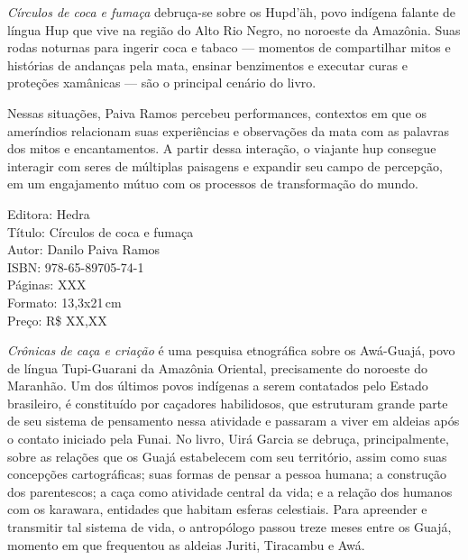 \pagebreak


\noindent{}\textit{Círculos de coca e fumaça} debruça-se sobre os Hupd’äh, povo indígena falante de língua Hup que vive na região do Alto Rio Negro, no noroeste da Amazônia. Suas rodas noturnas para ingerir coca e tabaco --- momentos de compartilhar mitos e histórias de andanças pela mata, ensinar benzimentos e executar curas e proteções xamânicas --- são o principal cenário do livro. 

Nessas situações, Paiva Ramos percebeu performances, contextos em que os ameríndios relacionam suas experiências e observações da mata com as palavras dos mitos e encantamentos. A partir dessa interação, o viajante hup consegue interagir com seres de múltiplas paisagens e expandir seu campo de percepção, em um engajamento mútuo com os processos de transformação do mundo.

\begin{ficha}
Editora: Hedra\\
Título: Círculos de coca e fumaça\\
Autor:  Danilo Paiva Ramos\\ 
ISBN: 978-65-89705-74-1\\
Páginas: XXX\\
Formato: 13,3x21\,cm\\
Preço: R\$ XX,XX\\
\end{ficha}

\pagebreak


\noindent{}\textit{Crônicas de caça e criação} é uma pesquisa etnográfica sobre os Awá-Guajá, povo de língua Tupi-Guarani da Amazônia Oriental, precisamente do noroeste do Maranhão. Um dos últimos povos indígenas a serem contatados pelo Estado brasileiro, é constituído por caçadores habilidosos, que estruturam grande parte de seu sistema de pensamento nessa atividade e passaram a viver em aldeias após o contato iniciado pela Funai. No livro, Uirá Garcia se debruça, principalmente, sobre as relações que os Guajá estabelecem com seu território, assim como suas concepções cartográficas; suas formas de pensar a pessoa humana; a construção dos parentescos; a caça como atividade central da vida; e a relação dos humanos com os karawara, entidades que habitam esferas celestiais. Para apreender e transmitir tal sistema de vida, o antropólogo passou treze meses entre os Guajá, momento em que frequentou as aldeias Juriti, Tiracambu e Awá.

